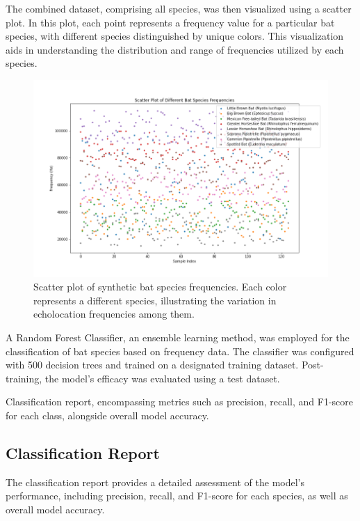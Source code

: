 \documentclass[12pt]{article}
\begin{document}
The combined dataset, comprising all species, was then visualized using a scatter plot. In this plot, each point represents a frequency value for a particular bat species, with different species distinguished by unique colors. This visualization aids in understanding the distribution and range of frequencies utilized by each species.

\begin{figure}[ht]
\centering
\includegraphics[width=1\textwidth]{bat_species_freq.png}
\caption{Scatter plot of synthetic bat species frequencies. Each color represents a different species, illustrating the variation in echolocation frequencies among them.}
\end{figure}

A Random Forest Classifier, an ensemble learning method, was employed for the classification of bat species based on frequency data. The classifier was configured with 500 decision trees and trained on a designated training dataset. Post-training, the model's efficacy was evaluated using a test dataset.

Classification report, encompassing metrics such as precision, recall, and F1-score for each class, alongside overall model accuracy.

\subsection{Classification Report}
The classification report provides a detailed assessment of the model's performance, including precision, recall, and F1-score for each species, as well as overall model accuracy.
\end{document}
